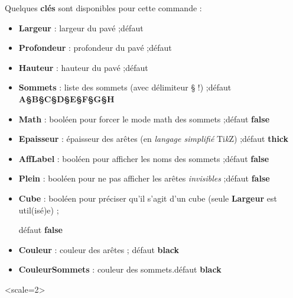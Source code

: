 \documentclass[french,a4paper,11pt]{article}
\providecommand\tikzlogo{Ti\textit{k}Z}
\let\TikZ\tikzlogo
\newcommand\Cle[1]{{\bfseries\sffamily\textlangle #1\textrangle}}
\begin{document}
\begin{tipblock}
Quelques \Cle{clés} sont disponibles pour cette commande :

\begin{itemize}
	\item \Cle{Largeur} : largeur du pavé ;\hfill{}défaut \Cle{2}
	\item \Cle{Profondeur} : profondeur du pavé ;\hfill{}défaut \Cle{1}
	\item \Cle{Hauteur} : hauteur du pavé ;\hfill{}défaut \Cle{1.25}
	\item \Cle{Sommets} : liste des sommets (avec délimiteur § !) ;\hfill{}défaut \Cle{A§B§C§D§E§F§G§H}
	\item \Cle{Math} : booléen pour forcer le mode math des sommets ;\hfill{}défaut \Cle{false}
	\item \Cle{Epaisseur} : épaisseur des arêtes (en \textit{langage simplifié} \TikZ) ;\hfill{}défaut \Cle{thick}
	\item \Cle{AffLabel} : booléen pour afficher les noms des sommets ;\hfill{}défaut \Cle{false}
	\item \Cle{Plein} : booléen pour ne pas afficher les arêtes \textit{invisibles} ;\hfill{}défaut \Cle{false}
	\item \Cle{Cube} : booléen pour préciser qu'il s'agit d'un cube (seule \Cle{Largeur} est util(isé)e) ;
	
	\hfill{}défaut \Cle{false}
	\item \Cle{Couleur} : couleur des arêtes ; \hfill{}défaut \Cle{black}
	
	\item \Cle{CouleurSommets} : couleur des sommets.\hfill{}défaut \Cle{black}
\end{itemize}
\vspace*{-\baselineskip}\leavevmode
\end{tipblock}

\pagebreak

\begin{PresCode}{}
\begin{EnvTikzEspace}
	\PaveTikzTriDim[Cube,Largeur=3,Couleur=red,CouleurSommets=blue,AffLabel]
\end{EnvTikzEspace}
\end{PresCode}

\begin{PresCode}{}
\begin{EnvTikzEspace}[VueClassique]<scale=2>
	\PaveTikzTriDim[Largeur=3,Profondeur=4,Hauteur=2,Plein,Couleur=gray,AffLabel, CouleurSommets=gray]
\end{EnvTikzEspace}
\end{PresCode}
\end{document}
